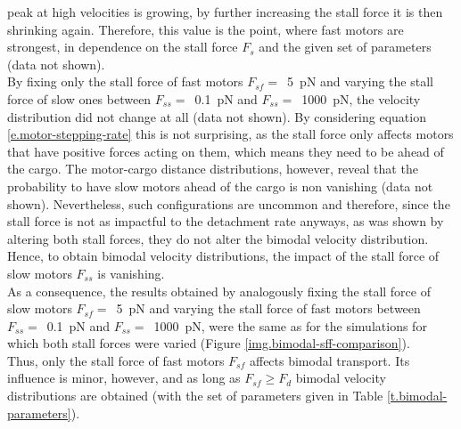 peak at high velocities is growing, by further increasing the stall force it is then shrinking again. Therefore, this value is the point, where fast motors are strongest, in dependence on the
stall force $F_{s}$ and the given set of parameters (data not shown). \\
By fixing only the stall force of fast motors \mbox{$F_{sf} =$ \SI{5}{\pico\newton}} and varying the stall force of slow ones between \mbox{$F_{ss} =$ \SI{0.1}{\pico\newton}} and
\mbox{$F_{ss} =$ \SI{1000}{\pico\newton}}, the velocity distribution did not change at all (data not shown). By considering equation \eqref{e.motor-stepping-rate} this is not surprising, as the stall force only
affects motors that have positive forces acting on them, which means they need to be ahead of the cargo. The motor-cargo distance distributions, however, reveal that the probability to have slow
motors ahead of the cargo is non vanishing (data not shown). Nevertheless, such configurations are uncommon and therefore, since the stall force is not as impactful to the detachment rate anyways, as was shown by
altering both stall forces, they do not alter the bimodal velocity distribution. Hence, to obtain bimodal velocity distributions, the impact of the stall force of slow motors $F_{ss}$ is
vanishing. \\
As a consequence, the results obtained by analogously fixing the  stall force of slow motors \mbox{$F_{sf} =$ \SI{5}{\pico\newton}} and varying the stall force of fast motors between
\mbox{$F_{ss} =$ \SI{0.1}{\pico\newton}} and \mbox{$F_{ss} =$ \SI{1000}{\pico\newton}}, were the same as for the simulations for which both stall forces were varied (Figure \ref{img.bimodal-sff-comparison}). \\
Thus, only the stall force of fast motors $F_{sf}$ affects bimodal transport. Its influence is minor, however, and as long as \mbox{$F_{sf} \geq F_{d}$} bimodal velocity distributions are obtained
(with the set of parameters given in Table \ref{t.bimodal-parameters}).


